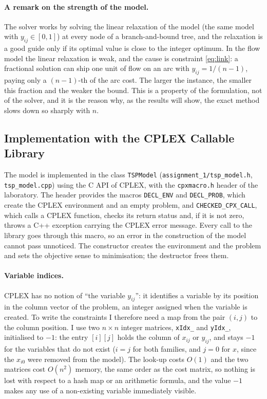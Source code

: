 \documentclass[11pt,a4paper]{article}
\begin{document}
\paragraph{A remark on the strength of the model.}
The solver works by solving the linear relaxation of the model (the same model with
$y_{ij}\in[0,1]$) at every node of a branch-and-bound tree, and the relaxation is a good
guide only if its optimal value is close to the integer optimum. In the flow model the linear
relaxation is weak, and the cause is constraint \eqref{eq:link}: a fractional solution can ship
one unit of flow on an arc with $y_{ij}=1/(n-1)$, paying only a $(n-1)$-th of the arc cost.
The larger the instance, the smaller this fraction and the weaker the bound. This is a
property of the formulation, not of the solver, and it is the reason why, as the results will show, the
exact method slows down so sharply with $n$.

\subsection{Implementation with the CPLEX Callable Library}\label{sec:impl1}
The model is implemented in the class \texttt{TSPModel} (\texttt{assignment\_1/tsp\_model.h},
\texttt{tsp\_model.cpp}) using the C API of CPLEX, with the \texttt{cpxmacro.h} header of the
laboratory. The header provides the macros \texttt{DECL\_ENV} and \texttt{DECL\_PROB}, which
create the CPLEX environment and an empty problem, and \texttt{CHECKED\_CPX\_CALL}, which
calls a CPLEX function, checks its return status and, if it is not zero, throws a C++
exception carrying the CPLEX error message. Every call to the library goes through this
macro, so an error in the construction of the model cannot pass unnoticed. The constructor
creates the environment and the problem and sets the objective sense to minimisation; the
destructor frees them.

\paragraph{Variable indices.}
CPLEX has no notion of ``the variable $y_{ij}$'': it identifies a variable by its position in
the column vector of the problem, an integer assigned when the variable is created. To write
the constraints I therefore need a map from the pair $(i,j)$ to the column position. I use
two $n\times n$ integer matrices, \texttt{xIdx\_} and \texttt{yIdx\_}, initialised to $-1$: the
entry $[i][j]$ holds the column of $x_{ij}$ or $y_{ij}$, and stays $-1$ for the variables
that do not exist ($i=j$ for both families, and $j=0$ for $x$, since the $x_{i0}$ were
removed from the model). The look-up costs $O(1)$ and the two matrices cost $O(n^2)$ memory,
the same order as the cost matrix, so nothing is lost with respect to a hash map or an
arithmetic formula, and the value $-1$ makes any use of a non-existing variable immediately
visible.
\end{document}
